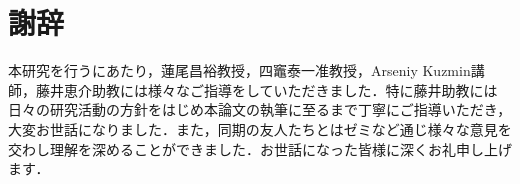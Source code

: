 \chapter*{謝辞}
本研究を行うにあたり，蓮尾昌裕教授，四竈泰一准教授，Arseniy Kuzmin講師，藤井恵介助教には様々なご指導をしていただきました．特に藤井助教には日々の研究活動の方針をはじめ本論文の執筆に至るまで丁寧にご指導いただき，大変お世話になりました．また，同期の友人たちとはゼミなど通じ様々な意見を交わし理解を深めることができました．お世話になった皆様に深くお礼申し上げます．